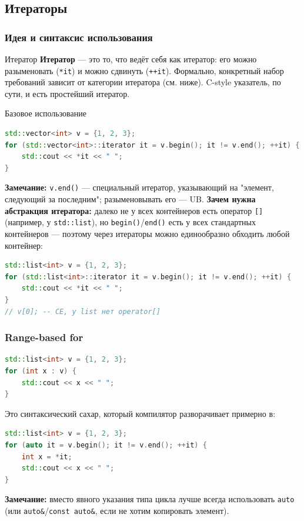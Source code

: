 \subsection{Итераторы}
\subsubsection{Идея и синтаксис использования}
\begin{definition}{Итератор}{}
\textbf{Итератор} --- это то, что ведёт себя как итератор: его можно разыменовать (\texttt{*it}) и можно сдвинуть (\texttt{++it}). Формально, конкретный набор требований зависит от категории итератора (см. ниже). C-style указатель, по сути, и есть простейший итератор.
\end{definition}
\begin{implementation}{Базовое использование}{}
\begin{lstlisting}[language=C++]
std::vector<int> v = {1, 2, 3};
for (std::vector<int>::iterator it = v.begin(); it != v.end(); ++it) {
    std::cout << *it << " ";
}
\end{lstlisting}
\end{implementation}
\textbf{Замечание:} \texttt{v.end()} --- специальный итератор, указывающий на "элемент, следующий за последним"; разыменовывать его --- UB.
\textbf{Зачем нужна абстракция итератора:} далеко не у всех контейнеров есть оператор \texttt{[]} (например, у \texttt{std::list}), но \texttt{begin()}/\texttt{end()} есть у всех стандартных контейнеров --- поэтому через итераторы можно единообразно обходить любой контейнер:
\begin{lstlisting}[language=C++]
std::list<int> v = {1, 2, 3};
for (std::list<int>::iterator it = v.begin(); it != v.end(); ++it) {
    std::cout << *it << " ";
}
// v[0]; -- CE, у list нет operator[]
\end{lstlisting}
\subsubsection{Range-based for}
\begin{lstlisting}[language=C++]
std::list<int> v = {1, 2, 3};
for (int x : v) {
    std::cout << x << " ";
}
\end{lstlisting}
Это синтаксический сахар, который компилятор разворачивает примерно в:
\begin{lstlisting}[language=C++]
std::list<int> v = {1, 2, 3};
for (auto it = v.begin(); it != v.end(); ++it) {
    int x = *it;
    std::cout << x << " ";
}
\end{lstlisting}
\textbf{Замечание:} вместо явного указания типа цикла лучше всегда использовать \texttt{auto} (или \texttt{auto\&}/\texttt{const auto\&}, если не хотим копировать элемент).
